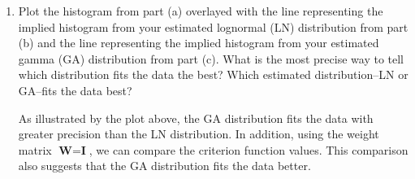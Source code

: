 \documentclass[letterpaper,12pt]{article}
\theoremstyle{definition}
\begin{document}
\begin{enumerate}
\begin{enumerate}
\item Plot the histogram from part (a) overlayed with the line representing the implied histogram from your estimated lognormal (LN) distribution from part (b) and the line representing the implied histogram from your estimated gamma (GA) distribution from part (c). What is the most precise way to tell which distribution fits the data the best? Which estimated distribution--LN or GA--fits the data best?
\par
\begin{figure}[H]\centering\captionsetup{width=4.0in}
\end{figure}
\par
As illustrated by the plot above, the GA distribution fits the data with greater precision than the LN distribution. In addition, using the weight matrix $\textbf{W} = \textbf{I}$, we can compare the criterion function values. This comparison also suggests that the GA distribution fits the data better.
\bigskip


\end{enumerate}
\end{enumerate}
\end{document}

